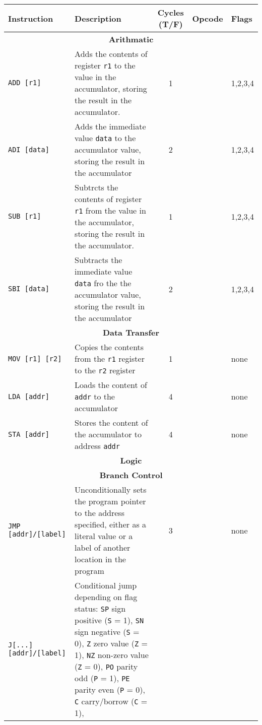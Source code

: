\documentclass[10pt]{article}
\begin{document}
\begin{tabular}{|p{4cm}p{6cm}cp{1cm}p{2cm}|}
\hline
Instruction & Description & Cycles (T/F) & Opcode & Flags\\
\hline
\multicolumn{5}{|c|}{\textbf{Arithmatic}}\\
\hline
\verb|ADD [r1]| & Adds the contents of register \verb|r1| to the value in the accumulator, storing the result in the accumulator. & 1 & & 1,2,3,4\\
\verb|ADI [data]| & Adds the immediate value \verb|data| to the accumulator  value, storing the result in the accumulator& 2 & & 1,2,3,4\\
\verb|SUB [r1]| & Subtrcts the contents of register \verb|r1| from the value in the accumulator, storing the result in the accumulator. & 1 & & 1,2,3,4\\
\verb|SBI [data]| & Subtracts the immediate value \verb|data| fro the the accumulator value, storing the result in the accumulator & 2 & & 1,2,3,4\\
\hline
\multicolumn{5}{|c|}{\textbf{Data Transfer}}\\
\hline
\verb|MOV [r1] [r2]| & Copies the contents from the \verb|r1| register to the \verb|r2| register & 1 & & none\\
\verb|LDA [addr]| & Loads the content of \verb|addr| to the accumulator & 4 & & none\\
\verb|STA [addr]| & Stores the content of the accumulator to address \verb|addr| & 4 & & none \\
\hline
\multicolumn{5}{|c|}{\textbf{Logic}}\\
\hline
\hline
\multicolumn{5}{|c|}{\textbf{Branch Control}}\\
\hline
\verb|JMP [addr]/[label]| & Unconditionally sets the program pointer to the address specified, either as a literal value or a label of another location in the program & 3 & & none \\
\verb|J[...] [addr]/[label]| & Conditional jump depending on flag status: 
\newline\verb|SP| sign positive (\verb|S| = 1),
\newline\verb|SN| sign negative (\verb|S| = 0),
\newline\verb|Z| zero value (\verb|Z| = 1),
\newline\verb|NZ| non-zero value (\verb|Z| = 0),
\newline\verb|PO| parity odd (\verb|P| = 1),
\newline\verb|PE| parity even (\verb|P| = 0),
\newline\verb|C| carry/borrow (\verb|C| = 1),

\end{tabular}
\end{document}
